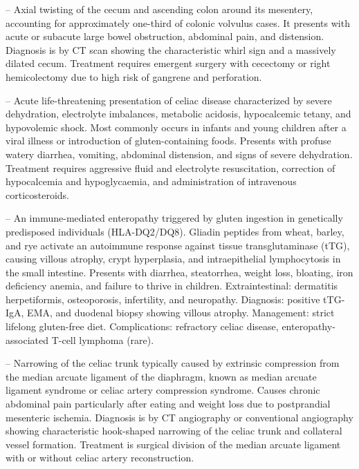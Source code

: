-- Axial twisting of the cecum and ascending colon around its mesentery, accounting for approximately one-third of colonic volvulus cases. It presents with acute or subacute large bowel obstruction, abdominal pain, and distension. Diagnosis is by CT scan showing the characteristic whirl sign and a massively dilated cecum. Treatment requires emergent surgery with cecectomy or right hemicolectomy due to high risk of gangrene and perforation.

-- Acute life-threatening presentation of celiac disease characterized by severe dehydration, electrolyte imbalances, metabolic acidosis, hypocalcemic tetany, and hypovolemic shock. Most commonly occurs in infants and young children after a viral illness or introduction of gluten-containing foods. Presents with profuse watery diarrhea, vomiting, abdominal distension, and signs of severe dehydration. Treatment requires aggressive fluid and electrolyte resuscitation, correction of hypocalcemia and hypoglycaemia, and administration of intravenous corticosteroids.

-- An immune-mediated enteropathy triggered by gluten ingestion in genetically predisposed individuals (HLA-DQ2/DQ8). Gliadin peptides from wheat, barley, and rye activate an autoimmune response against tissue transglutaminase (tTG), causing villous atrophy, crypt hyperplasia, and intraepithelial lymphocytosis in the small intestine. Presents with diarrhea, steatorrhea, weight loss, bloating, iron deficiency anemia, and failure to thrive in children. Extraintestinal: dermatitis herpetiformis, osteoporosis, infertility, and neuropathy. Diagnosis: positive tTG-IgA, EMA, and duodenal biopsy showing villous atrophy. Management: strict lifelong gluten-free diet. Complications: refractory celiac disease, enteropathy-associated T-cell lymphoma (rare).

-- Narrowing of the celiac trunk typically caused by extrinsic compression from the median arcuate ligament of the diaphragm, known as median arcuate ligament syndrome or celiac artery compression syndrome. Causes chronic abdominal pain particularly after eating and weight loss due to postprandial mesenteric ischemia. Diagnosis is by CT angiography or conventional angiography showing characteristic hook-shaped narrowing of the celiac trunk and collateral vessel formation. Treatment is surgical division of the median arcuate ligament with or without celiac artery reconstruction.

